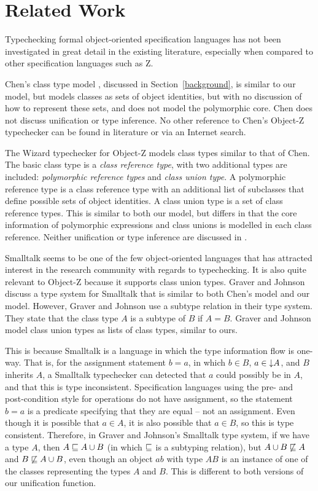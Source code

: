 \section{Related Work}

Typechecking formal object-oriented specification languages has not
been investigated in great detail in the existing literature,
especially when compared to other specification languages such as Z.

Chen's class type model \cite{chen94}, discussed in
Section~\ref{background}, is similar to our model, but models classes as
sets of object identities, but with no discussion of how to represent
these sets, and does not model the polymorphic core. Chen does not
discuss unification or type inference. No other reference to Chen's
Object-Z typechecker can be found in literature or via an Internet
search.

The Wizard typechecker for Object-Z \cite{johnston96} models class
types similar to that of Chen. The basic class type is a {\em class
reference type}, with two additional types are included: {\em
polymorphic reference types} and {\em class union type}. A polymorphic
reference type is a class reference type with an additional list of
subclasses that define possible sets of object identities. A class
union type is a set of class reference types. This is similar to both
our model, but differs in that the core information of polymorphic
expressions and class unions is modelled in each class
reference. Neither unification or type inference are discussed in
\cite{johnston96}.

Smalltalk \cite{goldberg83} seems to be one of the few object-oriented
languages that has attracted interest in the research community with
regards to typechecking. It is also quite relevant to Object-Z because
it supports class union types. Graver and Johnson \cite{graver90}
discuss a type system for Smalltalk that is similar to both Chen's
model and our model. However, Graver and Johnson use a subtype
relation in their type system.  They state that the class type $A$ is
a subtype of $B$ if $A = B$. Graver and Johnson model class union
types as lists of class types, similar to ours.

This is because Smalltalk is a language in which the type information
flow is one-way. That is, for the assignment statement $b = a$, in
which $b \in B$, $a \in \mathord\downarrow A$, and $B$ inherits $A$, a Smalltalk
typechecker can detected that $a$ could possibly be in $A$, and that
this is type inconsistent. Specification languages using the pre- and
post-condition style for operations do not have assignment, so the
statement $b = a$ is a predicate specifying that they are equal -- not
an assignment. Even though it is possible that $a \in A$, it is also
possible that $a \in B$, so this is type consistent. Therefore, in
Graver and Johnson's Smalltalk type system, if we have a type $A$,
then $A \subtypeeq A \classuni B$ (in which $\mathrel{\mathstrut{\sqsubseteq}}$ is a
subtyping relation), but $A \classuni B \not\subtypeeq A$ and $B
\not\subtypeeq A \classuni B$, even though an object $ab$ with type
$AB$ is an instance of one of the classes representing the types $A$
and $B$. This is different to both versions of our unification
function.
